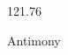 \documentclass[12pt]{article}
\begin{document}
\hfill{}
\vfill
\begin{center}
  {\fontsize{50}{60}
  }

  \vspace{1em}

  121.76

Antimony
\end{center}
\vfill
\end{document}
